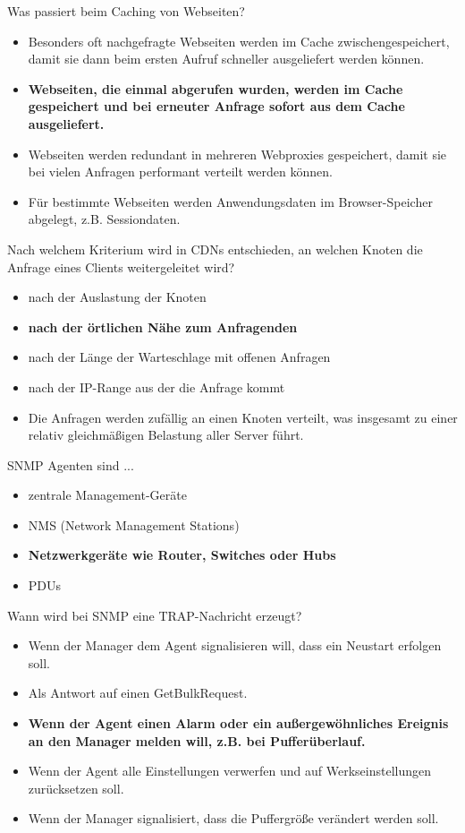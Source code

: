\documentclass{article}
\begin{document}
	Was passiert beim Caching von Webseiten? 
	\begin{itemize}
		\item Besonders oft nachgefragte Webseiten werden im Cache zwischengespeichert, damit sie dann beim ersten Aufruf schneller ausgeliefert werden können.
		\item \textbf{Webseiten, die einmal abgerufen wurden, werden im Cache gespeichert und bei erneuter Anfrage sofort aus dem Cache ausgeliefert. }
		\item Webseiten werden redundant in mehreren Webproxies gespeichert, damit sie bei vielen Anfragen performant verteilt werden können.
		\item Für bestimmte Webseiten werden Anwendungsdaten im Browser-Speicher abgelegt, z.B. Sessiondaten. 
	\end{itemize}
	
	Nach welchem Kriterium wird in CDNs entschieden, an welchen Knoten die Anfrage eines Clients weitergeleitet wird? 
	\begin{itemize}
		\item nach der Auslastung der Knoten
		\item \textbf{nach der örtlichen Nähe zum Anfragenden }
		\item nach der Länge der Warteschlage mit offenen Anfragen 
		\item nach der IP-Range aus der die Anfrage kommt 
		\item Die Anfragen werden zufällig an einen Knoten verteilt, was insgesamt zu einer relativ gleichmäßigen Belastung aller Server führt. 
	\end{itemize}

	SNMP Agenten sind ...
	\begin{itemize}
		\item zentrale Management-Geräte 
		\item NMS (Network Management Stations)
		\item \textbf{Netzwerkgeräte wie Router, Switches oder Hubs }
		\item PDUs
	\end{itemize}

	Wann wird bei SNMP eine TRAP-Nachricht erzeugt?
	\begin{itemize}
		\item Wenn der Manager dem Agent signalisieren will, dass ein Neustart erfolgen soll. 
		\item Als Antwort auf einen GetBulkRequest. 
		\item \textbf{Wenn der Agent einen Alarm oder ein außergewöhnliches Ereignis an den Manager melden will, z.B. bei Pufferüberlauf.} 
		\item Wenn der Agent alle Einstellungen verwerfen und auf Werkseinstellungen zurücksetzen soll. 
		\item Wenn der Manager signalisiert, dass die Puffergröße verändert werden soll. 
	\end{itemize}
	
\end{document}
